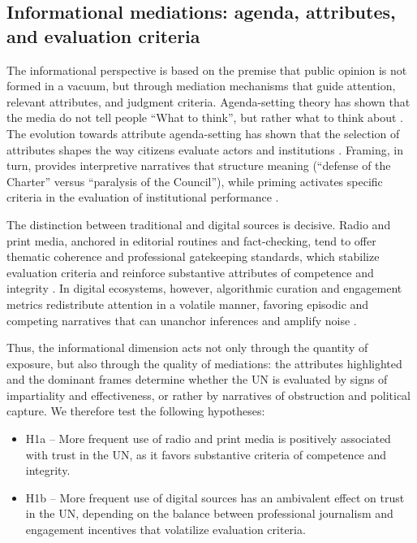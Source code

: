 \documentclass[english]{textolivre}
\begin{document}
\subsection{Informational mediations: agenda, attributes, and evaluation criteria}
The informational perspective is based on the premise that public opinion is not formed in a vacuum, but through mediation mechanisms that guide attention, relevant attributes, and judgment criteria. Agenda-setting theory has shown that the media do not tell people ``What to think'', but rather what to think about \cite{mccombs1972}. The evolution towards attribute agenda-setting \cite{su2024, almakaty2025} has shown that the selection of attributes shapes the way citizens evaluate actors and institutions \cite{mccombs2000}. Framing, in turn, provides interpretive narratives that structure meaning (``defense of the Charter'' versus ``paralysis of the Council''), while priming activates specific criteria in the evaluation of institutional performance \cite{entman1993, scheufele1999, chong2007}.

The distinction between traditional and digital sources is decisive. Radio and print media, anchored in editorial routines and fact-checking, tend to offer thematic coherence and professional gatekeeping standards, which stabilize evaluation criteria and reinforce substantive attributes of competence and integrity \cite{shoemaker2009}. In digital ecosystems, however, algorithmic curation and engagement metrics redistribute attention in a volatile manner, favoring episodic and competing narratives that can unanchor inferences and amplify noise \cite{silva2025}.

Thus, the informational dimension acts not only through the quantity of exposure, but also through the quality of mediations: the attributes highlighted and the dominant frames determine whether the UN is evaluated by signs of impartiality and effectiveness, or rather by narratives of obstruction and political capture. We therefore test the following hypotheses:

\begin{itemize}
    \item H1a -- More frequent use of radio and print media is positively associated with trust in the UN, as it favors substantive criteria of competence and integrity.
    \item H1b -- More frequent use of digital sources has an ambivalent effect on trust in the UN, depending on the balance between professional journalism and engagement incentives that volatilize evaluation criteria.
\end{itemize}
\end{document}
